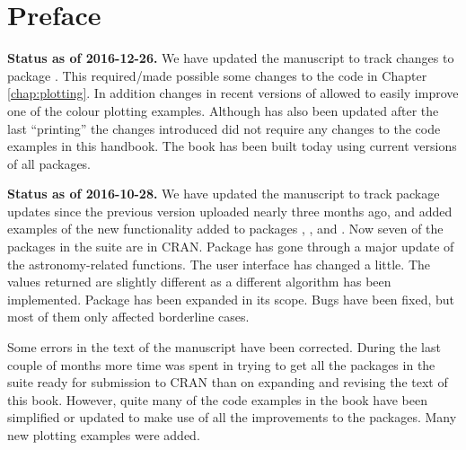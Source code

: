 \chapter{Preface}

\begin{shaded}
\noindent
\textbf{Status as of 2016-12-26.} We have updated the manuscript to track changes to package . This required/made possible some changes to the code in Chapter \ref{chap:plotting}. In addition changes in recent versions of  allowed to easily improve one of the colour plotting examples. Although  has also been updated after the last ``printing'' the changes introduced did not require any changes to the code examples in this handbook. The book has been built today using current versions of all packages.
\end{shaded}

\begin{shaded}
\noindent
\textbf{Status as of 2016-10-28.} We have updated the manuscript to track package updates since the previous version uploaded nearly three months ago, and added examples of the new functionality added to packages , , and . Now seven of the packages in the suite are in CRAN. Package  has gone through a major update of the astronomy-related functions. The user interface has changed a little. The values returned are slightly different as a different algorithm has been implemented. Package  has been expanded in its scope. Bugs have been fixed, but most of them only affected borderline cases.

Some errors in the text of the manuscript have been corrected. During the last couple of months more time was spent in trying to get all the packages in the suite ready for submission to CRAN than on expanding and revising the text of this book. However, quite many of the code examples in the book have been simplified or updated to make use of all the improvements to the packages. Many new plotting examples were added.
\end{shaded}

